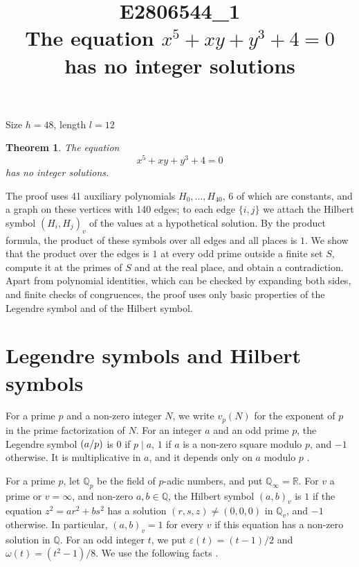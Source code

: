 \documentclass[11pt]{article}
\title{\textbf{E2806544\_1}\\[4pt] {\Large The equation $x^{5}+xy+y^{3}+4=0$ has no integer solutions}}
\author{}
\date{}
\newtheorem{theorem}{Theorem}
\newcommand{\Q}{\mathbb{Q}}
\newcommand{\leg}[2]{\mathchoice{\biggl(\dfrac{#1}{#2}\biggr)}{(#1/#2)}{(#1/#2)}{(#1/#2)}}
\begin{document}
\maketitle
\vspace{-8ex}
\begin{center}
Size $h=48$, length $l=12$
\end{center}

\begin{theorem}\label{thm:main}
The equation
\begin{equation}\label{eq:main}
x^{5}+xy+y^{3}+4=0
\end{equation}
has no integer solutions.
\end{theorem}

The proof uses 41 auxiliary polynomials $H_0,\dots,H_{40}$, 6 of which are constants, and a graph on these vertices with 140 edges; to each edge $\{i,j\}$ we attach the Hilbert symbol $(H_i,H_j)_v$ of the values at a hypothetical solution. By the product formula, the product of these symbols over all edges and all places is $1$. We show that the product over the edges is $1$ at every odd prime outside a finite set $S$, compute it at the primes of $S$ and at the real place, and obtain a contradiction. Apart from polynomial identities, which can be checked by expanding both sides, and finite checks of congruences, the proof uses only basic properties of the Legendre symbol and of the Hilbert symbol.

\section{Legendre symbols and Hilbert symbols}

For a prime $p$ and a non-zero integer $N$, we write $v_p(N)$ for the exponent of $p$ in the prime factorization of $N$. For an integer $a$ and an odd prime $p$, the Legendre symbol $\leg{a}{p}$ is $0$ if $p\mid a$, $1$ if $a$ is a non-zero square modulo $p$, and $-1$ otherwise. It is multiplicative in $a$, and it depends only on $a$ modulo $p$ \cite[Chapter~5]{IR}.

For a prime $p$, let $\Q_p$ be the field of $p$-adic numbers, and put $\Q_\infty=\mathbb R$. For $v$ a prime or $v=\infty$, and non-zero $a,b\in\Q$, the Hilbert symbol $(a,b)_v$ is $1$ if the equation $z^2=ar^2+bs^2$ has a solution $(r,s,z)\neq(0,0,0)$ in $\Q_v$, and $-1$ otherwise. In particular, $(a,b)_v=1$ for every $v$ if this equation has a non-zero solution in $\Q$. For an odd integer $t$, we put $\varepsilon(t)=(t-1)/2$ and $\omega(t)=(t^2-1)/8$. We use the following facts \cite[Chapter~III, Proposition~2 and Theorems~1 and~3]{Se}.
\end{document}
